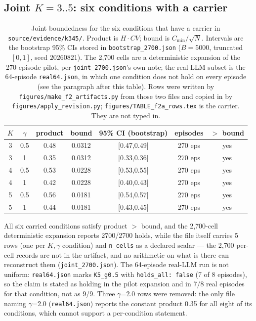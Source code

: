 \documentclass[10pt]{article}
\begin{document}
\subsection{Joint $K=3..5$: six conditions with a carrier}\label{sec:joint}
\begin{table}[ht]\centering\small
\caption{Joint boundedness for the six conditions that have a carrier in
\texttt{source/evidence/k345/}. Product is $H\!\cdot\!CV$; bound is
$C_{\min}/\sqrt{N}$. Intervals are the bootstrap 95\% CIs stored in
\texttt{bootstrap\_2700.json} ($B{=}5000$, truncated $[0,1]$, seed $20260821$).
The 2{,}700 cells are a deterministic expansion of the 270-episode pilot, per
\texttt{joint\_2700.json}'s own note; the real-LLM subset is the 64-episode
\texttt{real64.json}, in which one condition does not hold on every episode (see
the paragraph after this table). Rows were written by
\texttt{figures/make\_f2\_artifacts.py} from those two files and copied in by
\texttt{figures/apply\_revision.py}; \texttt{figures/TABLE\_f2a\_rows.tex} is the
carrier. They are not typed in.}
\label{tab:f2a}
\begin{tabular}{ccccccc}\toprule
$K$ & $\gamma$ & product & bound & 95\% CI (bootstrap) & episodes & $>$ bound \\
\midrule
3 &0.5&0.48&0.0312&[0.47,0.49]&270 eps&yes\\
3 &1&0.35&0.0312&[0.33,0.36]&270 eps&yes\\
4 &0.5&0.53&0.0228&[0.53,0.55]&270 eps&yes\\
4 &1&0.42&0.0228&[0.40,0.43]&270 eps&yes\\
5 &0.5&0.56&0.0181&[0.54,0.57]&270 eps&yes\\
5 &1&0.44&0.0181&[0.43,0.45]&270 eps&yes\\
\bottomrule\end{tabular}\end{table}
\noindent All six carried conditions satisfy product $>$ bound, and the
2{,}700-cell deterministic expansion reports 2700/2700 holds, while the file itself carries 5 rows (one per $K,\gamma$ condition) and \texttt{n\_cells} as a declared scalar --- the 2{,}700 per-cell records are not in the artifact, and no arithmetic on what is there can reconstruct them
(\texttt{joint\_2700.json}). The 64-episode real-LLM run is not uniform:
\texttt{real64.json} marks \texttt{K5\_g0.5} with \texttt{holds\_all: false}
(7 of 8 episodes), so the claim is stated as holding in the pilot expansion and
in 7/8 real episodes for that condition, not as 9/9. Three $\gamma$=2.0 rows were
removed: the only file naming $\gamma$=2.0 (\texttt{real64.json}) reports the
constant product 0.35 for all eight of its conditions, which cannot support a
per-condition statement.
\end{document}
